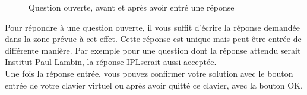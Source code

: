 \documentclass[11pt]{scrreprt}
\begin{document}
\begin{figure}[H]
{        }
        \caption{Question ouverte, avant et après avoir entré une réponse}
    \end{figure}
    Pour répondre à une question ouverte, il vous suffit d'écrire la réponse demandée dans la zone prévue à cet effet. Cette réponse est unique mais peut être entrée de différente manière. Par exemple pour une question dont la réponse attendu serait \og Institut Paul Lambin\fg, la réponse \og IPL\fg serait aussi acceptée.\\

    Une fois la réponse entrée, vous pouvez confirmer votre solution avec le bouton entrée de votre clavier virtuel ou après avoir quitté ce clavier, avec la bouton OK.
\end{document}
